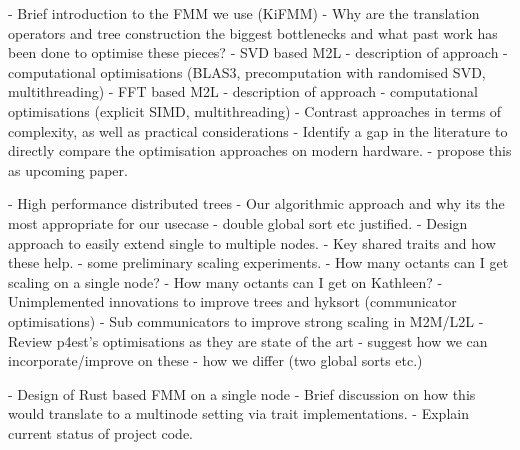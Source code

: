 



- Brief introduction to the FMM we use (KiFMM)
    - Why are the translation operators and tree construction the biggest bottlenecks and what past work has been done to optimise these pieces?
    - SVD based M2L
        - description of approach
        - computational optimisations (BLAS3, precomputation with randomised SVD, multithreading) 
    - FFT based M2L
        - description of approach
        - computational optimisations (explicit SIMD, multithreading) 
    - Contrast approaches in terms of complexity, as well as practical considerations
    - Identify a gap in the literature to directly compare the optimisation approaches on modern hardware.
        - propose this as upcoming paper.

    - High performance distributed trees
        - Our algorithmic approach and why its the most appropriate for our usecase
            - double global sort etc justified.
        - Design approach to easily extend single to multiple nodes.
        - Key shared traits and how these help.
    - some preliminary scaling experiments.
        - How many octants can I get scaling on a single node?
        - How many octants can I get on Kathleen?
    - Unimplemented innovations to improve trees and hyksort (communicator optimisations)
        - Sub communicators to improve strong scaling in M2M/L2L
        - Review p4est's optimisations as they are state of the art
            - suggest how we can incorporate/improve on these - how we differ (two global sorts etc.)

- Design of Rust based FMM on a single node
    - Brief discussion on how this would translate to a multinode setting via trait implementations.
    - Explain current status of project code.
